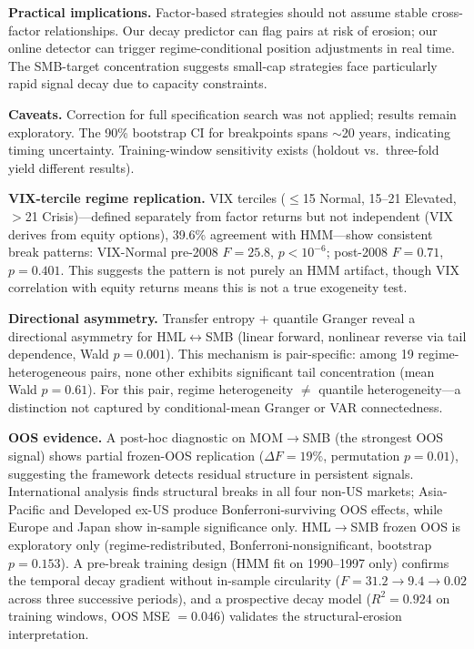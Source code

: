 \documentclass[sigconf,anonymous]{acmart}
\begin{document}
\textbf{Practical implications.}
Factor-based strategies should not assume stable cross-factor relationships.
Our decay predictor can flag pairs at risk of erosion; our online detector
can trigger regime-conditional position adjustments in real time.
The SMB-target concentration suggests small-cap strategies face
particularly rapid signal decay due to capacity constraints.

\textbf{Caveats.}
Correction for full specification search was not applied; results
remain exploratory. The 90\% bootstrap CI for breakpoints spans
$\sim$20 years, indicating timing uncertainty. Training-window
sensitivity exists (holdout vs.\ three-fold yield different results).

\textbf{VIX-tercile regime replication.}
VIX terciles ($\leq$15 Normal, 15--21 Elevated, $>$21 Crisis)---defined
separately from factor returns but not independent (VIX derives from
equity options), 39.6\% agreement with
HMM---show consistent break patterns: VIX-Normal pre-2008 $F = 25.8$,
$p < 10^{-6}$; post-2008 $F = 0.71$, $p = 0.401$.
This suggests the pattern is not purely an HMM artifact, though VIX
correlation with equity returns means this is not a true exogeneity test.

\textbf{Directional asymmetry.}
Transfer entropy + quantile Granger reveal a directional asymmetry
for HML$\leftrightarrow$SMB (linear forward, nonlinear reverse via tail
dependence, Wald $p = 0.001$). This mechanism is pair-specific: among 19
regime-heterogeneous pairs, none other exhibits significant tail
concentration (mean Wald $p = 0.61$). For this pair, regime
heterogeneity $\neq$ quantile heterogeneity---a distinction not
captured by conditional-mean Granger or VAR connectedness.

\textbf{OOS evidence.}
A post-hoc diagnostic on MOM$\to$SMB (the strongest OOS signal) shows
partial frozen-OOS replication ($\Delta F = 19\%$, permutation $p = 0.01$),
suggesting the framework detects residual structure in persistent signals.
International analysis finds structural breaks in all four non-US
markets; Asia-Pacific and Developed ex-US produce Bonferroni-surviving
OOS effects, while Europe and Japan show in-sample significance only.
HML$\to$SMB frozen OOS is exploratory only (regime-redistributed,
Bonferroni-nonsignificant, bootstrap $p = 0.153$).
A pre-break training design (HMM fit on 1990--1997 only) confirms the
temporal decay gradient without in-sample circularity
($F = 31.2 \to 9.4 \to 0.02$ across three successive periods), and a
prospective decay model ($R^2 = 0.924$ on training windows, OOS
MSE $= 0.046$) validates the structural-erosion interpretation.
\end{document}
